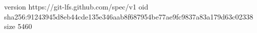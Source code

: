 version https://git-lfs.github.com/spec/v1
oid sha256:91243945d8eb44cde135e346aab8f687954be77ae9fc9837a83a179d63c02338
size 5460
